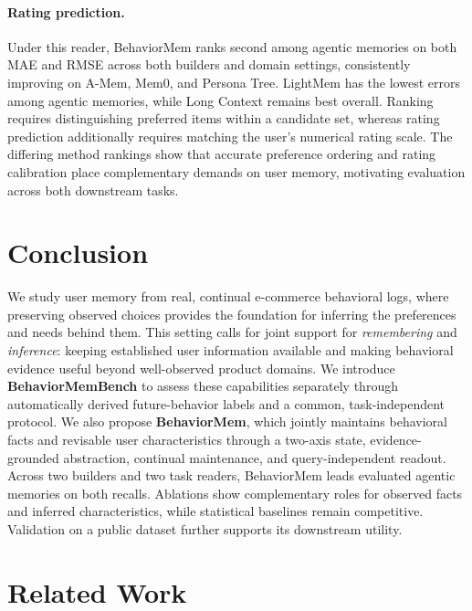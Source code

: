 \documentclass[sigconf,nonacm,balance=false]{acmart}
\begin{document}
\paragraph{\textbf{Rating prediction.}}
Under this reader, BehaviorMem ranks second among agentic memories on both MAE and RMSE across both builders and domain settings, consistently improving on A-Mem, Mem0, and Persona Tree. LightMem has the lowest errors among agentic memories, while Long Context remains best overall. Ranking requires distinguishing preferred items within a candidate set, whereas rating prediction additionally requires matching the user's numerical rating scale. The differing method rankings show that accurate preference ordering and rating calibration place complementary demands on user memory, motivating evaluation across both downstream tasks.



\section{Conclusion}
\label{sec:conclusion}

We study user memory from real, continual e-commerce behavioral logs, where preserving observed choices provides the foundation for inferring the preferences and needs behind them. This setting calls for joint support for \emph{remembering} and \emph{inference}: keeping established user information available and making behavioral evidence useful beyond well-observed product domains. We introduce \textbf{BehaviorMemBench} to assess these capabilities separately through automatically derived future-behavior labels and a common, task-independent protocol. We also propose \textbf{BehaviorMem}, which jointly maintains behavioral facts and revisable user characteristics through a two-axis state, evidence-grounded abstraction, continual maintenance, and query-independent readout. Across two builders and two task readers, BehaviorMem leads evaluated agentic memories on both recalls. Ablations show complementary roles for observed facts and inferred characteristics, while statistical baselines remain competitive. Validation on a public dataset further supports its downstream utility.


\section{Related Work}
\label{sec:related-work}
\end{document}
